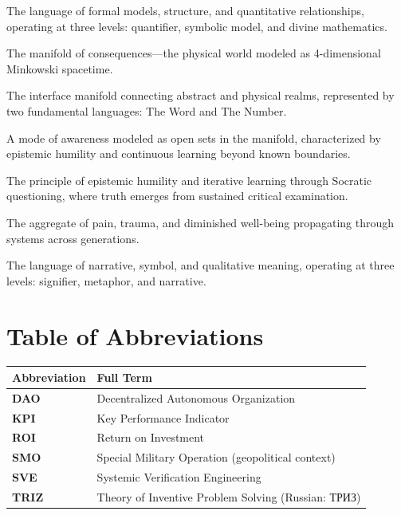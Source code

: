 \documentclass[11pt,a4paper]{article}
\begin{document}
\begin{small}
\begin{description}[style=nextline, leftmargin=0pt, labelindent=0pt, font=\normalfont\bfseries]
    \item[The Number] The language of formal models, structure, and quantitative relationships, operating at three levels: quantifier, symbolic model, and divine mathematics.
    
    \item[$\Omega$ (Omega Manifold)] The manifold of consequences—the physical world modeled as 4-dimensional Minkowski spacetime.
    
    \item[$\pi\text{-}\pi$ (Psyche Interface)] The interface manifold connecting abstract and physical realms, represented by two fundamental languages: The Word and The Number.
    
    \item[Socratic Consciousness] A mode of awareness modeled as open sets in the manifold, characterized by epistemic humility and continuous learning beyond known boundaries.
    
    \item[Socratic Tail] The principle of epistemic humility and iterative learning through Socratic questioning, where truth emerges from sustained critical examination.
    
    \item[Suffering (Operational Definition)] The aggregate of pain, trauma, and diminished well-being propagating through systems across generations.
    
    \item[The Word] The language of narrative, symbol, and qualitative meaning, operating at three levels: signifier, metaphor, and narrative.
\end{description}

\section*{Table of Abbreviations}

\begin{tabular}{@{}>{\bfseries}ll@{}}
\toprule
\normalfont\textbf{Abbreviation} & \textbf{Full Term} \\
\midrule
DAO & Decentralized Autonomous Organization \\
KPI & Key Performance Indicator \\
ROI & Return on Investment \\
SMO & Special Military Operation (geopolitical context) \\
SVE & Systemic Verification Engineering \\
TRIZ & Theory of Inventive Problem Solving (Russian: ТРИЗ) \\
\bottomrule
\end{tabular}


\end{small}
\end{document}
